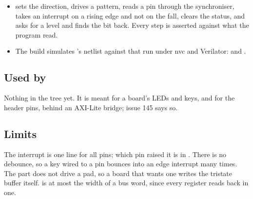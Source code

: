 \begin{itemize}
\item {} sets the direction, drives a
pattern, reads a pin through the synchroniser, takes an interrupt on a
rising edge and not on the fall, clears the status, and asks for a
level and finds the bit back. Every step is asserted against what the
program read.
\item The build simulates 's netlist against that run
under nvc and Verilator:  and
.
\end{itemize}

\subsection*{Used by}

Nothing in the tree yet. It is meant for a board's LEDs and keys, and
for the header pins, behind an AXI-Lite bridge; issue 145 says so.

\subsection*{Limits}

The interrupt is one line for all  pins; which pin raised it
is in . There is no debounce, so a key wired to a pin
bounces into an edge interrupt many times. The part does not drive a
pad, so a board that wants one writes the tristate buffer itself.
 is at most the width of a bus word, since every register
reads back in one.
